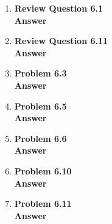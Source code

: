 \documentclass[12pt]{article}
\begin{document}
\renewcommand{\headrulewidth}{0.4pt}
\vspace{-3mm}
\begin{enumerate}
\item \textbf{Review Question 6.1}  \\

\textbf{Answer} \\

\item \textbf{Review Question 6.11}  \\

\textbf{Answer} \\

\item \textbf{Problem 6.3}  \\

\textbf{Answer} \\

\item \textbf{Problem 6.5}  \\

\textbf{Answer} \\

\item \textbf{Problem 6.6}  \\

\textbf{Answer} \\

\item \textbf{Problem 6.10}  \\

\textbf{Answer} \\

\item \textbf{Problem 6.11}  \\

\textbf{Answer} \\

\end{enumerate}
\end{document}
